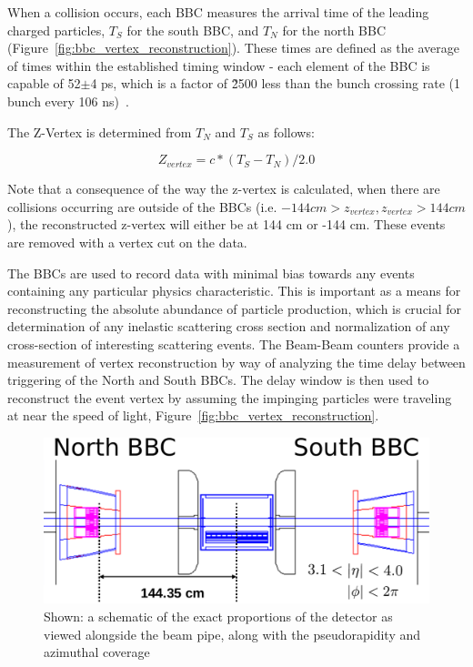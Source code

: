 When a collision occurs, each BBC measures the arrival time of the leading
charged particles, $T_S$ for the south BBC, and $T_N$ for the north BBC
(Figure~\ref{fig:bbc_vertex_reconstruction}). These times are defined as the
average of times within the established timing window - each element of the BBC
is capable of 52$\pm$4 ps, which is a factor of \~2500 less than the bunch
crossing rate (1 bunch every 106 ns)~\cite{Allen2003}.

The Z-Vertex is determined from $T_N$ and $T_S$ as follows:

\begin{equation}
  Z_{vertex} = c * (T_S - T_N) / 2.0
  \label{eq:zvtx_calc}
\end{equation}

Note that a consequence of the way the z-vertex is calculated, when there are
collisions occurring are outside of the BBCs (i.e. $-144 cm > z_{vertex}, z_{vertex}
> 144 cm$), the reconstructed z-vertex will either be at 144 cm or -144 cm.
These events are removed with a vertex cut on the data.

The BBCs are used to record data with minimal bias towards any events
containing any particular physics characteristic. This is important as a means
for reconstructing the absolute abundance of particle production, which is
crucial for determination of any inelastic scattering cross section and
normalization of any cross-section of interesting scattering events.  The
Beam-Beam counters provide a measurement of vertex reconstruction by way of
analyzing the time delay between triggering of the North and South BBCs.  The
delay window is then used to reconstruct the event vertex by assuming the
impinging particles were traveling at near the speed of light,
Figure~\ref{fig:bbc_vertex_reconstruction}. 

\begin{figure}[ht]
  \centering
  \includegraphics[width=\linewidth]{./figures/bbc_overview.pdf}
  \caption{
    Shown: a schematic of the exact proportions of the detector as viewed
    alongside the beam pipe, along with the pseudorapidity and azimuthal
    coverage~\cite{Nakamura2002}
  }
  \label{fig:bbc_overview}
\end{figure}

